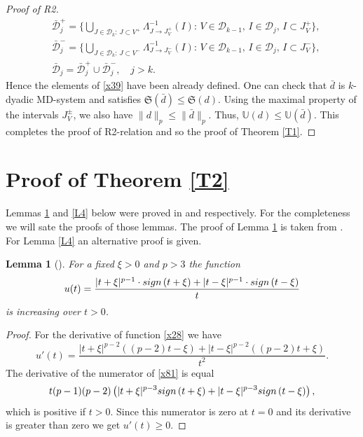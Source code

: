 \documentclass[12pt,reqno,fleqn]{amsart}
\newtheorem{lemma}{Lemma}[section]
\theoremstyle{definition}
\theoremstyle{definition}
\theoremstyle{remark}
\def\sign{{\rm sign\,}}
\def\ZU{\ensuremath{\mathbb U}}
\def\ZS{\ensuremath{\mathfrak S}}
\def\ZD{\ensuremath{\mathscr  D}}
\numberwithin{equation}{section}
\newcommand {\e }[1]{\eqref{#1}}
\newcommand {\lem }[1]{Lemma \ref{#1}}
\newcommand {\trm }[1]{Theorem \ref{#1}}
\begin{document}
\begin{proof}[Proof of R2]
\begin{align}
	&\bar{\ZD}_j^+=\bigg\{\bigcup_{J\in \ZD_k:\,  J\subset V^+}\Lambda_{J\to J_V^+}^{-1}(I):\,V\in \ZD_{k-1},\,I\in \ZD_j,\, I\subset J_V^+\bigg\},\\
	&\bar{\ZD}_j^-=\bigg\{\bigcup_{J\in \ZD_k:\,  J\subset V^-}\Lambda_{J\to J_V^-}^{-1}(I):\,V\in \ZD_{k-1},\,I\in \ZD_j,\, I\subset J_V^-\bigg\},\\
	&\bar{\ZD}_j=\bar{\ZD}_j^+\cup \bar{\ZD}_j^-,\quad j>k.
\end{align}
 Hence the elements of \e{x39} have been already defined. One can check that 
$\bar{d}$ is $k$-dyadic MD-system and satisfies $\ZS(\bar d)\le \ZS(d)$. Using the maximal property of the intervals $J_V^\pm$, we also have $\|d\|_p\le \|\bar d\|_p$. Thus, $\ZU(d)\le\ZU(\bar d)$. This completes the proof of R2-relation and so the proof of \trm{T1}.

\end{proof}




\section{Proof of \trm{T2}}
Lemmas \ref{L3} and \ref{L4} below were proved in \cite{Kom} and \cite{Whi} respectively. For the completeness we will sate the proofs of those lemmas. The proof of \lem{L3} is taken from \cite{Kom}. For \lem{L4} an alternative proof is given.  
\begin{lemma}[\cite{Kom}]\label{L3}
	For a fixed $\xi>0$ and $p>3$ the function 
	\begin{equation}\label{x28}
		u(t)=\frac{|t+\xi|^{p-1}\cdot \sign(t+\xi)+|t-\xi|^{p-1}\cdot \sign(t-\xi)}{t}
	\end{equation}
is increasing over $t>0$. 
\end{lemma}
\begin{proof}
For the derivative of function \e{x28} we have 
\begin{equation}\label{x81}
	u'(t)=\frac{|t+\xi|^{p-2}((p-2)t-\xi)+|t-\xi|^{p-2}((p-2)t+\xi)}{t^2}.
\end{equation}
The derivative of the numerator of \e{x81} is equal
\begin{equation*}
	t(p-1)(p-2)\left(|t+\xi|^{p-3}\sign(t+\xi)+|t-\xi|^{p-3}\sign(t-\xi)\right),
\end{equation*}
which is positive if $t>0$. Since this numerator is zero at $t=0$ and its derivative is greater than zero we get $u'(t)\ge 0$.
\end{proof}
\end{document}
